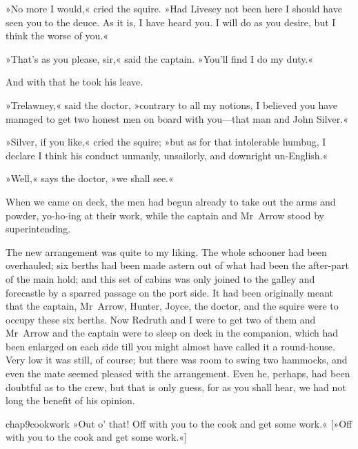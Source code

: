 »No more I would,« cried the squire. »Had Livesey not been here I should have seen you to the deuce. As it is, I have heard you. I will do as you desire, but I think the worse of you.«

»That's as you please, sir,« said the captain. »You'll find I do my duty.«

And with that he took his leave.

»Trelawney,« said the doctor, »contrary to all my notions, I believed you have managed to get two honest men on board with you—that man and John Silver.«

»Silver, if you like,« cried the squire; »but as for that intolerable humbug, I declare I think his conduct unmanly, unsailorly, and downright un-English.«

»Well,« says the doctor, »we shall see.«

When we came on deck, the men had begun already to take out the arms and powder, yo-ho-ing at their work, while the captain and Mr~Arrow stood by superintending.

The new arrangement was quite to my liking. The whole schooner had been overhauled; six berths had been made astern out of what had been the after-part of the main hold; and this set of cabins was only joined to the galley and forecastle by a sparred passage on the port side. It had been originally meant that the captain, Mr~Arrow, Hunter, Joyce, the doctor, and the squire were to occupy these six berths. Now Redruth and I were to get two of them and Mr~Arrow and the captain were to sleep on deck in the companion, which had been enlarged on each side till you might almost have called it a round-house. Very low it was still, of course; but there was room to swing two hammocks, and even the mate seemed pleased with the arrangement. Even he, perhaps, had been doubtful as to the crew, but that is only guess, for as you shall hear, we had not long the benefit of his opinion.


\begin{bwbigpic}
	[\picsize]
	{chap9cookwork}
	{»Out o' that! Off with you to the cook and get some work.«}
	[»Off with you to the cook and get some work.«]
\end{bwbigpic}

